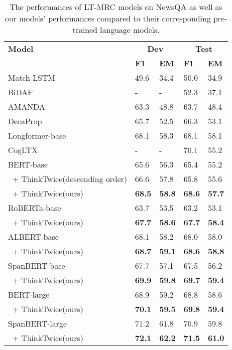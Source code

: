 \begin{table}[]
    \centering
    \caption{The performances of LT-MRC models on NewsQA as well as our models' performances compared to their corresponding pre-trained language models.}
    \begin{tabular}{p{140pt}p{24pt}<{\centering}p{24pt}<{\centering}p{24pt}<{\centering}p{24pt}<{\centering}}
         \hline
         {\bfseries Model} & \multicolumn{2}{c}{\bfseries Dev} & \multicolumn{2}{c}{\bfseries Test} \\
         & {\bfseries F1} & {\bfseries EM} & {\bfseries F1} & {\bfseries EM} \\
         \hline
         Match-LSTM~\cite{wang2015learning} & 49.6 & 34.4 & 50.0 & 34.9 \\
         BiDAF~\cite{seo2016bidirectional} & - & - & 52.3 & 37.1 \\
         AMANDA~\cite{kundu2018question} & 63.3 & 48.8 & 63.7 & 48.4 \\
         DecaProp~\cite{tay2018densely} & 65.7 & 52.5 & 66.3 & 53.1 \\
         Longformer-base~\cite{beltagy2020longformer} & 68.1 & 58.3 & 68.1 & 58.1 \\
         CogLTX~\cite{ding2020cogltx} & - & - & 70.1 & 55.2 \\
         \hline
         \hline
         BERT-base~\cite{devlin2018bert} & 65.6 & 56.3 & 65.4 & 55.2 \\
         $\ $ + ThinkTwice(descending order) & 66.6 & 57.8 & 65.8 & 55.6 \\
         $\ $ + ThinkTwice(ours) & {\bfseries 68.5} & {\bfseries58.8} & {\bfseries68.6} & {\bfseries57.7} \\
         \hline
         RoBERTa-base~\cite{liu2019roberta} & 63.7 & 53.5 & 63.2 & 53.1 \\
         $\ $ + ThinkTwice(ours) & {\bfseries67.7} & {\bfseries58.6} & {\bfseries67.7} & {\bfseries58.4} \\
         \hline
         ALBERT-base~\cite{lan2019albert} & 68.1 & 58.2 & 68.0 & 58.0 \\
         $\ $ + ThinkTwice(ours) & {\bfseries68.7} & {\bfseries59.1} & {\bfseries68.6} & {\bfseries58.8} \\
         \hline
         SpanBERT-base~\cite{joshi2020spanbert} & 67.7 & 57.1 & 67.5 & 56.2 \\
         $\ $ + ThinkTwice(ours) & {\bfseries69.9} & {\bfseries59.8} & {\bfseries69.7} & {\bfseries59.4} \\
         \hline
         BERT-large & 68.9 & 59.2 & 68.8 & 58.6 \\
         $\ $ + ThinkTwice(ours) & {\bfseries70.1} & {\bfseries59.5} & {\bfseries69.8} & {\bfseries59.4} \\
         \hline
         SpanBERT-large & 71.2 & 61.8 & 70.9 & 59.8 \\
         $\ $ + ThinkTwice(ours) & {\bfseries72.1} & {\bfseries62.2} & {\bfseries71.5} & {\bfseries61.0} \\
         \hline
    \end{tabular}
    \label{tab:3-1}
\end{table}
